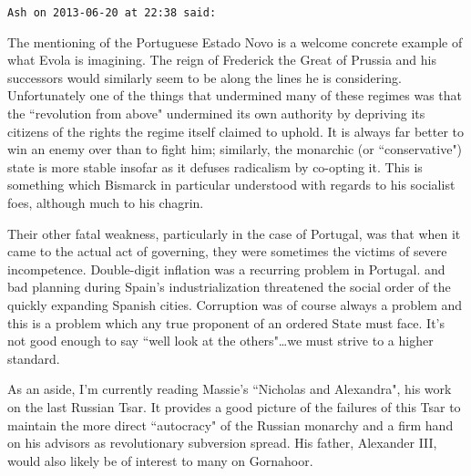 \begin{footnotesize}
\begin{sffamily}
\texttt{Ash on 2013-06-20 at 22:38 said: }

The mentioning of the Portuguese Estado Novo is a welcome concrete example of what Evola is imagining. The reign of Frederick the Great of Prussia and his successors would similarly seem to be along the lines he is considering. Unfortunately one of the things that undermined many of these regimes was that the ``revolution from above" undermined its own authority by depriving its citizens of the rights the regime itself claimed to uphold. It is always far better to win an enemy over than to fight him; similarly, the monarchic (or ``conservative") state is more stable insofar as it defuses radicalism by co-opting it. This is something which Bismarck in particular understood with regards to his socialist foes, although much to his chagrin. 

Their other fatal weakness, particularly in the case of Portugal, was that when it came to the actual act of governing, they were sometimes the victims of severe incompetence. Double-digit inflation was a recurring problem in Portugal. and bad planning during Spain's industrialization threatened the social order of the quickly expanding Spanish cities. Corruption was of course always a problem and this is a problem which any true proponent of an ordered State must face. It's not good enough to say ``well look at the others"…we must strive to a higher standard.

As an aside, I'm currently reading Massie's ``Nicholas and Alexandra", his work on the last Russian Tsar. It provides a good picture of the failures of this Tsar to maintain the more direct ``autocracy" of the Russian monarchy and a firm hand on his advisors as revolutionary subversion spread. His father, Alexander III, would also likely be of interest to many on Gornahoor.


\end{sffamily}\end{footnotesize}

